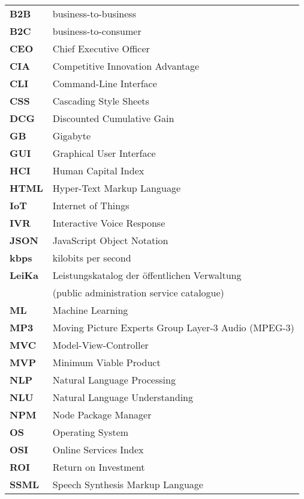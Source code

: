 \begin{flushleft}
\begin{tabular}{ll}
\textbf{B2B}				&	business-to-business\\
\textbf{B2C}				&	business-to-consumer\\

\textbf{CEO}	&	Chief Executive Officer\\
\textbf{CIA}	&	Competitive Innovation Advantage\\
\textbf{CLI}	&	Command-Line Interface\\
\textbf{CSS}	&	Cascading Style Sheets\\

\textbf{DCG}	&	Discounted Cumulative Gain\\

\textbf{GB}	&	Gigabyte\\
\textbf{GUI}	&	Graphical User Interface\\

\textbf{HCI}	&	Human Capital Index\\
\textbf{HTML}	&	Hyper-Text Markup Language\\

\textbf{IoT}	&	Internet of Things\\
\textbf{IVR}	&	Interactive Voice Response\\

\textbf{JSON}	&	JavaScript Object Notation\\

\textbf{kbps}	&	kilobits per second\\

\textbf{LeiKa}	&	Leistungskatalog der öffentlichen Verwaltung \\
& (public administration service catalogue)\\


\textbf{ML}		&	Machine Learning\\
\textbf{MP3}	&	Moving Picture Experts Group Layer-3 Audio (MPEG-3)\\
\textbf{MVC}	&	Model-View-Controller\\
\textbf{MVP}	&	Minimum Viable Product\\

\textbf{NLP}	&	Natural Language Processing\\
\textbf{NLU}	&	Natural Language Understanding\\
\textbf{NPM}	&	Node Package Manager\\

\textbf{OS}		&	Operating System\\
\textbf{OSI}	&	Online Services Index\\
\textbf{ROI}	&	Return on Investment\\
\textbf{SSML}	&	Speech Synthesis Markup Language\\


\end{tabular}
\end{flushleft}
